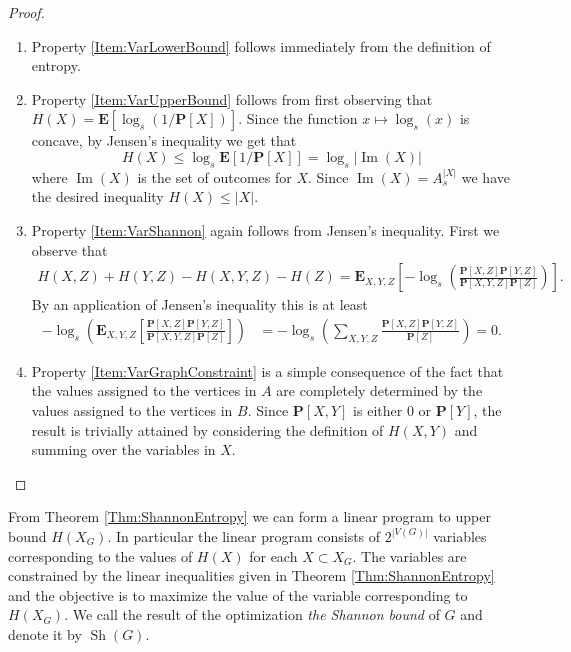 \documentclass[a4paper, 14pt]{extarticle}
\theoremstyle{plain}
\def\mb{\mathbf}
\DeclareMathOperator{\Image}{Im}
\DeclareMathOperator{\Sh}{Sh}
\begin{document}
\begin{proof} $ $
\begin{enumerate}
\item Property \ref{Item:VarLowerBound} follows immediately from the
definition of entropy.

\item Property \ref{Item:VarUpperBound} follows from first observing that
$H(X) = \mb{E}[\log_s(1/\mb{P}[X])]$. Since the function $x \mapsto \log_s(x)$ is concave, by Jensen's inequality we get that \[H(X)\leq \log_s
\mb{E}[1/\mb{P}[X]] = \log_s |\Image(X)|\] where $\Image(X)$ is the
set of outcomes for $X$. Since $\Image(X)=A_s^{|X|}$ we have the
desired inequality $H(X)\leq |X|$.

\item Property \ref{Item:VarShannon} again follows from Jensen's
inequality. First we observe that
\begin{align*}
H(X,Z)+H(Y,Z)-H(X,Y,Z)-H(Z) =
\mb{E}_{X,Y,Z}\left[-\log_s\left(\frac{\mb{P}[X,Z]\mb{P}[Y,Z]}{\mb{P}[X,Y,Z]\mb{P}[Z]}\right)\right].
\end{align*}
By an application of Jensen's inequality this is at least
\begin{align*}
-\log_s\left(\mb{E}_{X,Y,Z}\left[\frac{\mb{P}[X,Z]\mb{P}[Y,Z]}{\mb{P}[X,Y,Z]\mb{P}[Z]}\right]\right)
&=
-\log_s\left(\sum_{X,Y,Z}\frac{\mb{P}[X,Z]\mb{P}[Y,Z]}{\mb{P}[Z]}\right)%
= 0.
\end{align*}

\item Property \ref{Item:VarGraphConstraint} is a simple consequence of the fact that
the values assigned to the vertices in $A$ are completely
determined by the values assigned to the vertices in $B$. Since
$\mb{P}[X,Y]$ is either $0$ or $\mb{P}[Y]$, the result is trivially
attained by considering the definition of $H(X,Y)$ and summing over
the variables in $X$. \qedhere
\end{enumerate}
\end{proof}

From Theorem \ref{Thm:ShannonEntropy} we can form a linear program
to upper bound $H(X_G)$. In particular the linear program consists
of $2^{|V(G)|}$ variables corresponding to the values of $H(X)$ for
each $X\subset X_G$. The variables are constrained by the linear
inequalities given in Theorem \ref{Thm:ShannonEntropy} and the
objective is to maximize the value of the variable corresponding to
$H(X_G)$. We call the result of the optimization \emph{the Shannon
bound} of $G$ and denote it by $\Sh(G)$.
\end{document}
